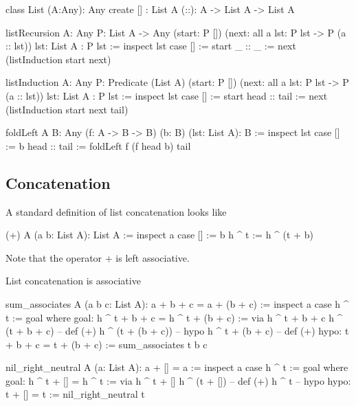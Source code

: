 \begin{alba}
    class
        List (A:Any): Any
    create
        [] : List A
        (::): A -> List A -> List A
\end{alba}


\begin{alba}
    listRecursion
        {A: Any}
        {P: List A -> Any}
        (start: P [])
        (next: all {a lst}: P lst -> P (a :: lst))
        {lst: List A}
        : P lst
    :=
        inspect lst case
            [] :=
                start
            _ :: _ :=
                next (listInduction start next)

    listInduction
        {A: Any}
        {P: Predicate (List A)}
        (start: P [])
        (next: all {a lst}: P lst -> P (a :: lst))
        {lst: List A}
        : P lst
    :=
        inspect lst case
            [] :=
                start
            head :: tail :=
                next (listInduction start next {tail})

    foldLeft {A B: Any} (f: A -> B -> B) (b: B) (lst: List A): B :=
        inspect lst case
            [] :=
                b
            head :: tail :=
                foldLeft f (f head b) tail
\end{alba}


\subsection{Concatenation}


A standard definition of list concatenation looks like

\begin{alba}
  (+) A (a b: List A): List A :=
    inspect a case
      [] :=
        b
      h ^ t :=
        h ^ (t + b)
\end{alba}
Note that the operator $+$ is left associative.


List concatenation is associative
%
\begin{alba}
  sum_associates A (a b c: List A): a + b + c = a + (b + c) :=
    inspect a case
      h ^ t :=
        goal where
          goal: h ^ t + b + c = h ^ t + (b + c) :=
            via
               h ^ t + b + c
               h ^ (t + b + c)      -- def (+)
               h ^ (t + (b + c))    -- hypo
               h ^ t + (b + c)      -- def (+)
          hypo: t + b + c = t + (b + c) :=
            sum_associates t b c
\end{alba}


\begin{alba}
  nil_right_neutral A (a: List A): a + [] = a :=
    inspect a case
      h ^ t :=
        goal where
          goal: h ^ t + [] = h ^ t :=
            via
              h ^ t + []
              h ^ (t + [])   -- def (+)
              h ^ t          -- hypo
          hypo: t + [] = t :=
            nil_right_neutral t
\end{alba}

